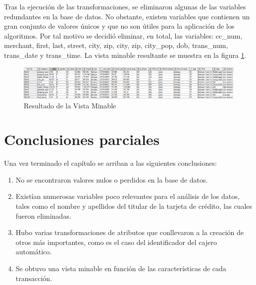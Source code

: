 Tras la ejecución de las transformaciones, se eliminaron algunas de las variables redundantes en la base de datos. No obstante, existen variables que contienen un gran conjunto de valores únicos y que no son útiles para la aplicación de los algoritmos. Por tal motivo se decidió eliminar, en total, las variables: \textsf{cc\_num, merchant, first, last, street, city, zip, city, zip, city\_pop, dob, trans\_num, trans\_date} y \textsf{trans\_time}. La vista minable resultante se muestra en la figura \ref{fig:vista-minable}.
\begin{figure}[H]
	\centering
	\includegraphics[width=1\linewidth]{figuras/vista-minable}
	\caption{Resultado de la Vista Minable}
	\label{fig:vista-minable}
\end{figure}

\section{Conclusiones parciales}


Una vez terminado el capítulo se arriban a las siguientes conclusiones:

\begin{enumerate}
	\setlength\itemsep{0em}
	\item No se encontraron valores nulos o perdidos en la base de datos.
	\item Existían numerosas variables poco relevantes para el análisis de los datos, tales como el nombre y apellidos del titular de la tarjeta de crédito, las cuales fueron eliminadas.
	\item Hubo varias transformaciones de atributos que conllevaron a la creación de otros más importantes, como es el caso del identificador del cajero automático.
	\item Se obtuvo una vista minable en función de las características de cada transacción.
\end{enumerate}
\pagebreak


